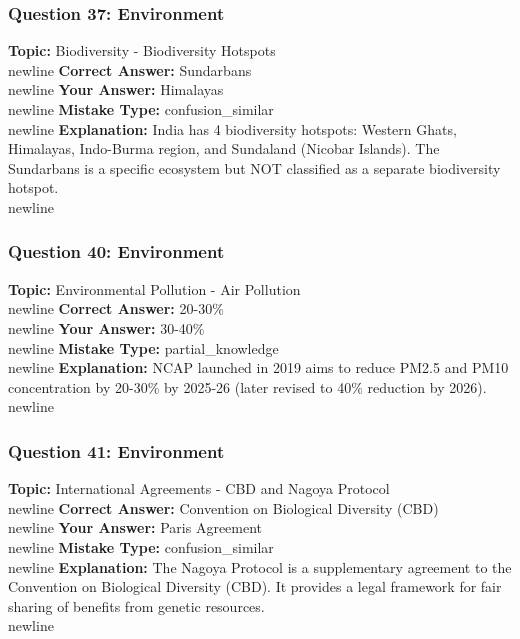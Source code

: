 \documentclass[a4paper,12pt]{article}
\begin{document}
\subsubsection{Question 37: Environment}
\textbf{Topic:} Biodiversity - Biodiversity Hotspots\\newline
\textbf{Correct Answer:} Sundarbans\\newline
\textbf{Your Answer:} \textcolor{wrongred}{Himalayas}\\newline
\textbf{Mistake Type:} confusion\_similar\\newline
\textbf{Explanation:} India has 4 biodiversity hotspots: Western Ghats, Himalayas, Indo-Burma region, and Sundaland (Nicobar Islands). The Sundarbans is a specific ecosystem but NOT classified as a separate biodiversity hotspot.\\newline
\vspace{0.5cm}
\subsubsection{Question 40: Environment}
\textbf{Topic:} Environmental Pollution - Air Pollution\\newline
\textbf{Correct Answer:} 20-30\%\\newline
\textbf{Your Answer:} \textcolor{wrongred}{30-40\%}\\newline
\textbf{Mistake Type:} partial\_knowledge\\newline
\textbf{Explanation:} NCAP launched in 2019 aims to reduce PM2.5 and PM10 concentration by 20-30\% by 2025-26 (later revised to 40\% reduction by 2026).\\newline
\vspace{0.5cm}
\subsubsection{Question 41: Environment}
\textbf{Topic:} International Agreements - CBD and Nagoya Protocol\\newline
\textbf{Correct Answer:} Convention on Biological Diversity (CBD)\\newline
\textbf{Your Answer:} \textcolor{wrongred}{Paris Agreement}\\newline
\textbf{Mistake Type:} confusion\_similar\\newline
\textbf{Explanation:} The Nagoya Protocol is a supplementary agreement to the Convention on Biological Diversity (CBD). It provides a legal framework for fair sharing of benefits from genetic resources.\\newline
\vspace{0.5cm}
\end{document}
